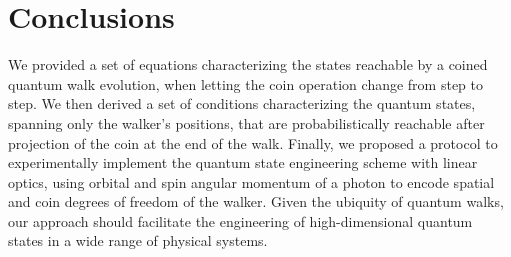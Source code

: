 \section{Conclusions} We provided a set of equations characterizing the states reachable by a coined quantum walk evolution, when letting the coin operation change from step to step.
We then derived a set of conditions characterizing the quantum states, spanning only the walker's positions, that are probabilistically reachable after projection of the coin at the end of the walk.
Finally, we proposed a protocol to experimentally implement the quantum state engineering scheme with linear optics, using orbital and spin angular momentum of a photon to encode spatial and coin degrees of freedom of the walker.
Given the ubiquity of quantum walks, our approach should facilitate the engineering of high-dimensional quantum states in a wide range of physical systems.


